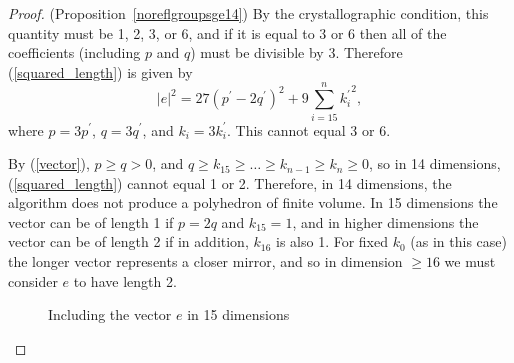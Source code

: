 \documentclass[smallcondensed]{svjour3}                     %
\begin{document}
\begin{proof}{(Proposition~\ref{noreflgroupsge14})}
By the crystallographic condition, this quantity must be 1, 2, 3, or 6, and if it is equal to 3 or 6 then all of the coefficients (including $p$ and $q$) must be divisible by 3. Therefore (\ref{squared_length}) is given by
\[|e|^2 = 27(p^\prime-2q^\prime)^2 + 9\sum_{i=15}^n {k_i^\prime}^2,\]
where $p = 3p^\prime$, $q = 3q^\prime$, and $k_i = 3{k_i^\prime}$. This cannot equal 3 or 6.

By (\ref{vector}), $p \ge q > 0$, and $q \ge k_{15} \ge \ldots \ge k_{n-1} \ge k_n \ge 0$, so in 14 dimensions, (\ref{squared_length}) cannot equal 1 or 2. Therefore, in 14 dimensions, the algorithm does not produce a polyhedron of finite volume. In 15 dimensions the vector can be of length 1 if $p = 2q$ and $k_{15} = 1$, and in higher dimensions the vector can be of length 2 if in addition, $k_{16}$ is also 1. For fixed $k_0$ (as in this case) the longer vector represents a closer mirror, and so in dimension $\ge 16$ we must consider $e$ to have length 2.

\begin{figure}
\centering
\caption{\label{15_dim}Including the vector $e$ in 15 dimensions}
\end{figure}
\end{proof}
\end{document}
